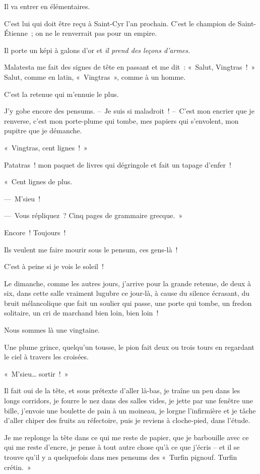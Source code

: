 \documentclass[french,twoside]{book} %
\begin{document}
Il va entrer en élémentaires.\par
C’est lui qui doit être reçu à Saint-Cyr l’an prochain. C’est le champion de Saint-Étienne ; on ne le renverrait pas pour un empire.\par
Il porte un képi à galons d’or et \emph{il prend des leçons d’armes.}\par
Malatesta me fait des signes de tête en passant et me dit : « Salut, Vingtras ! » Salut, comme en latin, « Vingtras », comme à un homme.\par
\bigbreak
\noindent C’est la retenue qui m’ennuie le plus.\par
J’y gobe encore des pensums. – Je suis si maladroit ! – C’est mon encrier que je renverse, c’est mon porte-plume qui tombe, mes papiers qui s’envolent, mon pupitre que je démanche.\par
« Vingtras, cent lignes ! »\par
Patatras ! mon paquet de livres qui dégringole et fait un tapage d’enfer !\par
« Cent lignes de plus.\par
— M’sieu !\par
— Vous répliquez ? Cinq pages de grammaire grecque. »\par
Encore ! Toujours !\par
Ils veulent me faire mourir sous le pensum, ces gens-là !\par
C’est à peine si je vois le soleil !\par
Le dimanche, comme les autres jours, j’arrive pour la grande retenue, de deux à six, dans cette salle vraiment lugubre ce jour-là, à cause du silence écrasant, du bruit mélancolique que fait un soulier qui passe, une porte qui tombe, un fredon solitaire, un cri de marchand bien loin, bien loin !\par
Nous sommes là une vingtaine.\par
Une plume grince, quelqu’un tousse, le pion fait deux ou trois tours en regardant le ciel à travers les croisées.\par
« M’sieu… sortir ! »\par
Il fait oui de la tête, et sous prétexte d’aller là-bas, je traîne un peu dans les longs corridors, je fourre le nez dans des salles vides, je jette par une fenêtre une bille, j’envoie une boulette de pain à un moineau, je lorgne l’infirmière et je tâche d’aller chiper des fruits au réfectoire, puis je reviens à cloche-pied, dans l’étude.\par
Je me replonge la tête dans ce qui me reste de papier, que je barbouille avec ce qui me reste d’encre, je pense à tout autre chose qu’à ce que j’écris – et il se trouve qu’il y a quelquefois dans mes pensums des « Turfin pignouf. Turfin crétin. »\par
\end{document}

